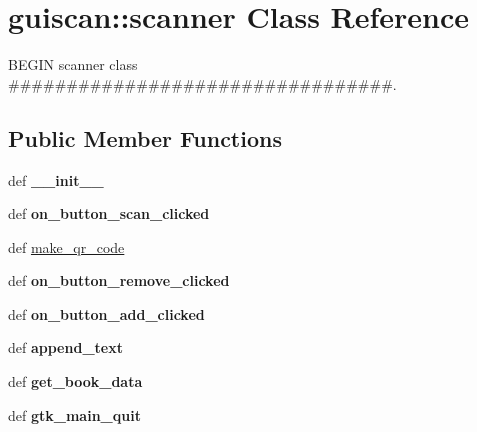 \hypertarget{classguiscan_1_1scanner}{
\section{guiscan::scanner Class Reference}
\label{classguiscan_1_1scanner}
}


BEGIN scanner class \#\#\#\#\#\#\#\#\#\#\#\#\#\#\#\#\#\#\#\#\#\#\#\#\#\#\#\#\#\#\#\#\#.  


\subsection*{Public Member Functions}
\begin{DoxyCompactItemize}
\item 
\hypertarget{classguiscan_1_1scanner_a24bf6dd8edd117579f128998757654a0}{
def {\bfseries \_\-\_\-init\_\-\_\-}}
\label{classguiscan_1_1scanner_a24bf6dd8edd117579f128998757654a0}

\item 
\hypertarget{classguiscan_1_1scanner_a3985b7e8a7c583f1855ffefb09f614dd}{
def {\bfseries on\_\-button\_\-scan\_\-clicked}}
\label{classguiscan_1_1scanner_a3985b7e8a7c583f1855ffefb09f614dd}

\item 
def \hyperlink{classguiscan_1_1scanner_a99a34b9d6414b7e32662581b02a703a2}{make\_\-qr\_\-code}
\item 
\hypertarget{classguiscan_1_1scanner_aed3d81af22db6558f5039b08209667cb}{
def {\bfseries on\_\-button\_\-remove\_\-clicked}}
\label{classguiscan_1_1scanner_aed3d81af22db6558f5039b08209667cb}

\item 
\hypertarget{classguiscan_1_1scanner_af48fc927b531df3991648cbca7ba715a}{
def {\bfseries on\_\-button\_\-add\_\-clicked}}
\label{classguiscan_1_1scanner_af48fc927b531df3991648cbca7ba715a}

\item 
\hypertarget{classguiscan_1_1scanner_ac7fb4a3b65f7f4cb165dd5700d31c128}{
def {\bfseries append\_\-text}}
\label{classguiscan_1_1scanner_ac7fb4a3b65f7f4cb165dd5700d31c128}

\item 
\hypertarget{classguiscan_1_1scanner_a01865857f839cf3e5bcd8f8b74bd418e}{
def {\bfseries get\_\-book\_\-data}}
\label{classguiscan_1_1scanner_a01865857f839cf3e5bcd8f8b74bd418e}

\item 
\hypertarget{classguiscan_1_1scanner_af8dad2898aba6607bf75b6a5fcf18249}{
def {\bfseries gtk\_\-main\_\-quit}}
\label{classguiscan_1_1scanner_af8dad2898aba6607bf75b6a5fcf18249}

\end{DoxyCompactItemize}
